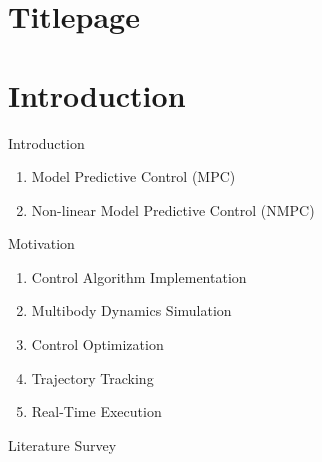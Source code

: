 \documentclass{beamer}
\begin{document}
\section*{Titlepage}
\begin{frame}\titlepage\end{frame}

\section{Introduction}
\begin{frame}{Introduction}
    \begin{enumerate}
        \item Model Predictive Control (MPC)
        \item Non-linear Model Predictive Control (NMPC)
    \end{enumerate}
\end{frame}\normalfont

\begin{frame}{Motivation}
    \begin{enumerate}
        \item Control Algorithm Implementation
        \item Multibody Dynamics Simulation
        \item Control Optimization
        \item Trajectory Tracking
        \item Real-Time Execution
    \end{enumerate}

\end{frame}

\begin{frame}{Literature Survey}

\end{frame}
\end{document}
